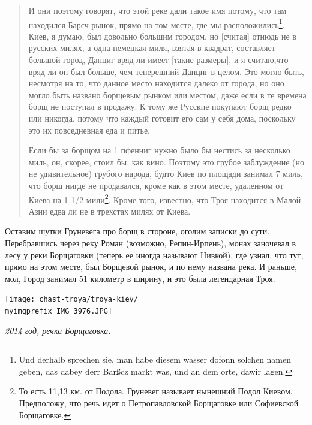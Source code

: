 \begin{quotation}
И они поэтому говорят, что этой реке дали такое имя потому, что там находился Барсч рынок, прямо на том месте, где мы расположились\footnote{Und derhalb sprechen sie, man habe diesem wasser dofonn solchen namen geben, das dabey derr Barßcz markt was, und an dem orte, dawir lagen.}. Киев, я думаю, был довольно большим городом, но [считая] отнюдь не в русских милях, а одна немецкая миля, взятая в квадрат, составляет большой город, Данциг вряд ли имеет [такие размеры], и я считаю,что вряд ли он был больше, чем теперешний Данциг в целом. Это могло быть, несмотря на то, что данное место находится далеко от города, но оно могло быть названо борщевым рынком или местом, даже если в те времена борщ не поступал в продажу. К тому же Русские покупают борщ редко или никогда, потому что каждый готовит его сам у себя дома, поскольку это их повседневная еда и питье.

Если бы за борщом на 1 пфенниг нужно было бы нестись за несколько миль, он, скорее, стоил бы, как вино. Поэтому это грубое заблуждение (но не удивительное) грубого народа, будто Киев по площади занимал 7 миль, что борщ нигде не продавался, кроме как в этом месте, удаленном от Киева на 1 1/2 мили\footnote{То есть 11,13 км. от Подола. Груневег называет нынешний Подол Киевом. Предположу, что речь идет о Петропавловской Борщаговке или Софиевской Борщаговке.}. Кроме того, известно, что Троя находится в Малой Азии едва ли не в трехстах милях от Киева.
\end{quotation}

Оставим шутки Груневега про борщ в стороне, оголим записки до сути. Перебравшись через реку Роман (возможно, Репин-Ирпень), монах заночевал в лесу у реки Борщаговки (теперь ее иногда называют Нивкой), где узнал, что тут, прямо на этом месте, был Борщевой рынок, и по нему названа река. И раньше, мол, Город занимал 51 километр в ширину, и это была легендарная Троя.

\begin{center}
\texttt{[image: chast-troya/troya-kiev/\\myimgprefix IMG\_3976.JPG]}

\textit{2014 год, речка Борщаговка.}
\end{center}

